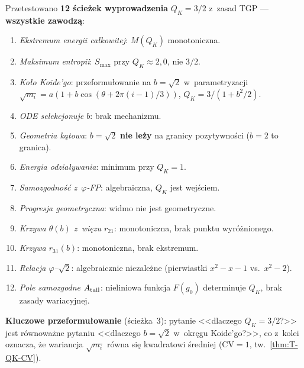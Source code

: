\begin{remark}[Wyczerpuj\k{a}ce pr\'oby wyprowadzenia $Q_K = 3/2$ (v47b)]%
\label{rem:T-QK-derivation-attempts}
Przetestowano \textbf{12 \'scie\.zek wyprowadzenia} $Q_K = 3/2$
z~zasad TGP --- \textbf{wszystkie zawodz\k{a}}:
\begin{enumerate}[nosep]
  \item \emph{Ekstremum energii ca\l{}kowitej}: $M(Q_K)$ monotoniczna.
  \item \emph{Maksimum entropii}: $S_{\max}$ przy $Q_K \approx 2{,}0$, nie $3/2$.
  \item \emph{Ko\l{}o Koide'go}: przeformu\l{}owanie na $b = \sqrt{2}$
    w~parametryzacji $\sqrt{m_i} = a(1 + b\cos(\theta + 2\pi(i{-}1)/3))$,
    $Q_K = 3/(1 + b^2/2)$.
  \item \emph{ODE selekcjonuje $b$}: brak mechanizmu.
  \item \emph{Geometria k\k{a}towa}: $b = \sqrt{2}$ \textbf{nie le\.zy}
    na granicy pozytywno\'sci ($b = 2$ to granica).
  \item \emph{Energia odzia\l{}ywania}: minimum przy $Q_K = 1$.
  \item \emph{Samozgodno\'s\'c z~$\varphi$-FP}: algebraiczna, $Q_K$ jest wej\'sciem.
  \item \emph{Progresja geometryczna}: widmo nie jest geometryczne.
  \item \emph{Krzywa $\theta(b)$ z~wi\k{e}zu $r_{21}$}: monotoniczna,
    brak punktu wyr\'o\.znionego.
  \item \emph{Krzywa $r_{31}(b)$}: monotoniczna, brak ekstremum.
  \item \emph{Relacja $\varphi$--$\sqrt{2}$}: algebraicznie niezale\.zne
    (pierwiastki $x^2 - x - 1$ vs.\ $x^2 - 2$).
  \item \emph{Pole samozgodne $A_{\rm tail}$}: nieliniowa funkcja $F(g_0)$
    determinuje $Q_K$, brak zasady wariacyjnej.
\end{enumerate}

\medskip\noindent
\textbf{Kluczowe przeformu\l{}owanie} (\'scie\.zka~3):
pytanie <<dlaczego $Q_K = 3/2$?>> jest r\'ownowa\.zne pytaniu
<<dlaczego $b = \sqrt{2}$ w~okr\k{e}gu Koide'go?>>,
co z~kolei oznacza, \.ze wariancja $\sqrt{m_i}$ r\'owna si\k{e}
kwadratowi \'sredniej ($\mathrm{CV} = 1$, tw.~\ref{thm:T-QK-CV}).


\end{remark}
